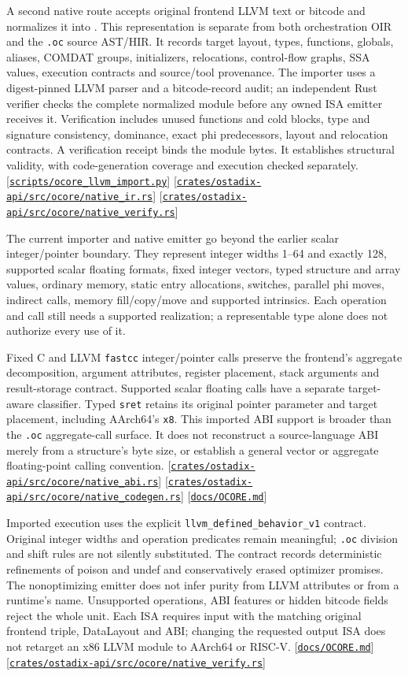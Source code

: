 \documentclass[11pt,oneside]{article}
\newcommand{\oir}{{\mdseries\textsc{OIR}}}
\newcommand{\src}[1]{\textcolor{OSlate}{\scriptsize[\href{https://github.com/lostadi/OSTADIX/blob/c0b02c326b2329a95ba52447c7180bc93957cd57/#1}{\nolinkurl{#1}}]}\allowbreak}
\newcommand{\breakcode}[1]{\texttt{\seqsplit{#1}}}
\begin{document}
A second native route accepts original frontend LLVM text or bitcode and
normalizes it into \breakcode{ocore-native-module-v1}. This representation is
separate from both orchestration \oir{} and the \texttt{.oc} source AST/HIR.
It records target layout, types, functions, globals, aliases, COMDAT groups,
initializers, relocations, control-flow graphs, SSA values, execution contracts
and source/tool provenance. The importer uses a digest-pinned LLVM parser and
a bitcode-record audit; an independent Rust verifier checks the complete
normalized module before any owned ISA emitter receives it. Verification
includes unused functions and cold blocks, type and signature consistency,
dominance, exact phi predecessors, layout and relocation contracts. A
verification receipt binds the module bytes. It establishes structural
validity, with code-generation coverage and execution checked separately.
\src{scripts/ocore_llvm_import.py}
\src{crates/ostadix-api/src/ocore/native_ir.rs}
\src{crates/ostadix-api/src/ocore/native_verify.rs}

The current importer and native emitter go beyond the earlier scalar
integer/pointer boundary. They represent integer widths 1--64 and exactly
128, supported scalar floating formats, fixed integer vectors, typed
structure and array values, ordinary memory, static entry allocations,
switches, parallel phi moves, indirect calls, memory fill/copy/move and
supported intrinsics. Each operation and call still needs a supported
realization; a representable type alone does not authorize every use of it.

Fixed C and LLVM \texttt{fastcc} integer/pointer calls preserve the frontend's
aggregate decomposition, argument attributes, register placement, stack
arguments and result-storage contract. Supported scalar floating calls have
a separate target-aware classifier. Typed \texttt{sret} retains its original
pointer parameter and target placement, including AArch64's \texttt{x8}.
This imported ABI support is broader than the \texttt{.oc} aggregate-call
surface. It does not reconstruct a source-language ABI merely from a
structure's byte size, or establish a general vector or aggregate
floating-point calling convention.
\src{crates/ostadix-api/src/ocore/native_abi.rs}
\src{crates/ostadix-api/src/ocore/native_codegen.rs}
\src{docs/OCORE.md}

Imported execution uses the explicit
\texttt{llvm\_defined\_behavior\_v1} contract. Original integer widths and
operation predicates remain meaningful; \texttt{.oc} division and shift rules
are not silently substituted. The contract records deterministic refinements
of poison and undef and conservatively erased optimizer promises. The
nonoptimizing emitter does not infer purity from LLVM attributes or from a
runtime's name. Unsupported operations, ABI features or hidden bitcode fields
reject the whole unit. Each ISA requires input with the matching original
frontend triple, DataLayout and ABI; changing the requested output ISA does
not retarget an x86 LLVM module to AArch64 or RISC-V.
\src{docs/OCORE.md}
\src{crates/ostadix-api/src/ocore/native_verify.rs}
\end{document}
